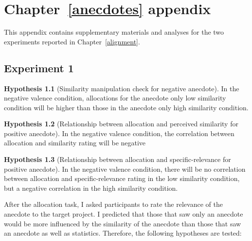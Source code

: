 \documentclass[a4paper, nobind, dvipsnames]{templates/ociamthesis}
\theoremstyle{definition}
\theoremstyle{definition}
\theoremstyle{definition}
\theoremstyle{definition}
\newtheorem{hypothesis}{Hypothesis}[chapter]
\theoremstyle{remark}
\begin{document}
\hypertarget{anecdotes-appendix}{%
\chapter{Chapter~\ref{anecdotes} appendix}\label{anecdotes-appendix}}

\minitoc

This appendix contains supplementary materials and analyses for the two
experiments reported in Chapter~\ref{alignment}.

\hypertarget{anecdotes-1-appendix}{%
\section{Experiment 1}\label{anecdotes-1-appendix}}

\begin{hypothesis}[Similarity manipulation check for negative anecdote]
\protect\hypertarget{hyp:similarity-check-anecdotes-1}{}{\label{hyp:similarity-check-anecdotes-1} {} }In the negative valence condition, allocations for the anecdote only low
similarity condition will be higher than those in the anecdote only high
similarity condition.
\end{hypothesis}

\begin{hypothesis}[Relationship between allocation and perceived similarity for positive anecdote]
\protect\hypertarget{hyp:allocation-similarity-anecdotes-1}{}{\label{hyp:allocation-similarity-anecdotes-1} {} }In the negative valence condition, the correlation between allocation and
similarity rating will be negative
\end{hypothesis}

\begin{hypothesis}[Relationship between allocation and specific-relevance for positive anecdote]
\protect\hypertarget{hyp:allocation-specific-relevance-anecdotes-1}{}{\label{hyp:allocation-specific-relevance-anecdotes-1} {} }In the negative valence condition, there will be no correlation between
allocation and specific-relevance rating in the low similarity condition, but a
negative correlation in the high similarity condition.
\end{hypothesis}

After the allocation task, I asked participants to rate the relevance of the
anecdote to the target project. I predicted that those that saw only an
anecdote would be more influenced by the similarity of the anecdote than those
that saw an anecdote as well as statistics. Therefore, the following hypotheses
are tested:
\end{document}
